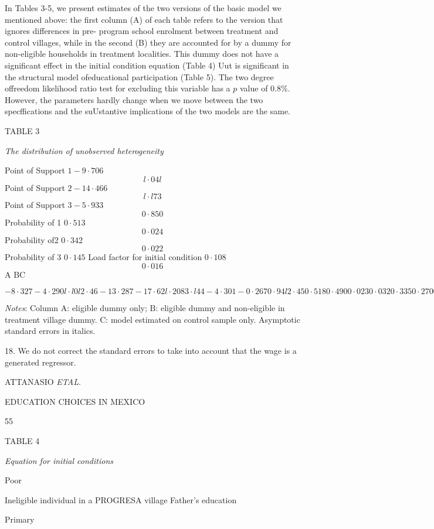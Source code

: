 In Tables 3-5, we present estimates of the two versions of the basic model we mentioned above: the first column (A) of each table refers to the version that ignores differences in pre- program school enrolment between treatment and control villages, while in the second (B) they are accounted for by a dummy for non-eligible households in treatment localities. This dummy does not have a significant effect in the initial condition equation (Table 4) Uut is significant in the structural model ofeducational participation (Table 5). The two degree offreedom likelihood ratio test for excluding this variable has a $p$ value of 0.8\%. However, the parameters hardly change when we move between the two specffications and the suUstantive implications of the two models are the same.

TABLE 3

{\it The distribution of unobserved heterogeneity}

Point of Support $1 -9\cdot 706$
$$
l\cdot 04l
$$
Point of Support $2 -14\cdot 466$
$$
l\cdot l73
$$
Point of Support $3 -5\cdot 933$
$$
0\cdot 850
$$
Probability of 1 $0\cdot 513$
$$
0\cdot 024
$$
Probability of2 $0\cdot 342$
$$
0\cdot 022
$$
Probability of 3 $0\cdot 145$ Load factor for initial condition $0\cdot 108$
$$
0\cdot 016
$$
A $\mathrm{B} \mathrm{C}$

$-8\cdot 327 -4\cdot 290 l\cdot l0l 2\cdot 46 -13\cdot 287 -17\cdot 62 l\cdot 208 3\cdot l44 -4\cdot 301 -0\cdot 267 0\cdot 94l 2\cdot 45 0\cdot 518 0\cdot 490 0\cdot 023 0\cdot 032 0\cdot 335 0\cdot 270 0\cdot 02l 0\cdot 0l7 0\cdot 147 0\cdot 240 0\cdot 102 0\cdot 068 0\cdot 014 0\cdot 013$

{\it Notes}: Column $\mathrm{A}$: eligible dummy only; $\mathrm{B}$: eligible dummy and non-eligible in treatment village dummy. $\mathrm{C}$: model estimated on control sample only. Asymptotic standard errors in italics.

18. We do not correct the standard errors to take into account that the wage is a generated regressor.

ATTANASIO {\it ETAL}.

EDUCATION CHOICES IN MEXICO

55

TABLE 4

{\it Equation for initial conditions}

Poor

Ineligible individual in a PROGRESA village Father's education

Primary

